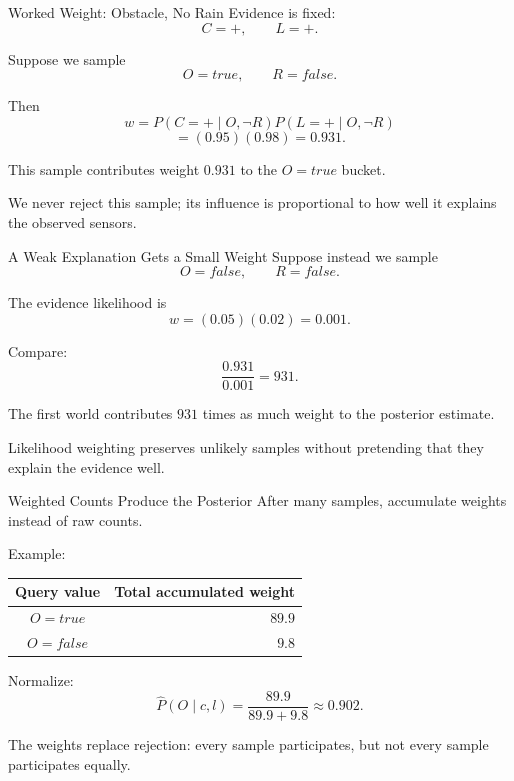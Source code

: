 \documentclass[aspectratio=169,10pt]{beamer}
\begin{document}
\begin{frame}[shrink=10]{Worked Weight: Obstacle, No Rain}
  Evidence is fixed:
  \[
    C=+,\qquad L=+.
  \]

  Suppose we sample
  \[
    O=true,\qquad R=false.
  \]

  Then
  \[
    w=P(C=+\mid O,\neg R)P(L=+\mid O,\neg R)
  \]
  \[
    =(0.95)(0.98)=0.931.
  \]

  This sample contributes weight $0.931$ to the $O=true$ bucket.

  \begin{keyidea}
    We never reject this sample; its influence is proportional to how well it explains the observed sensors.
  \end{keyidea}
\end{frame}

\begin{frame}[shrink=10]{A Weak Explanation Gets a Small Weight}
  Suppose instead we sample
  \[
    O=false,\qquad R=false.
  \]

  The evidence likelihood is
  \[
    w=(0.05)(0.02)=0.001.
  \]

  Compare:
  \[
    \frac{0.931}{0.001}=931.
  \]

  The first world contributes $931$ times as much weight to the posterior estimate.

  \begin{keyidea}
    Likelihood weighting preserves unlikely samples without pretending that they explain the evidence well.
  \end{keyidea}
\end{frame}

\begin{frame}[shrink=10]{Weighted Counts Produce the Posterior}
  After many samples, accumulate weights instead of raw counts.

  Example:
  \begin{center}
  \renewcommand{\arraystretch}{1.3}
  \begin{tabular}{c|r}
    \textbf{Query value} & \textbf{Total accumulated weight} \\\hline
    $O=true$ & $89.9$ \\
    $O=false$ & $9.8$
  \end{tabular}
  \end{center}

  Normalize:
  \[
    \widehat{P}(O\mid c,l)
    =
    \frac{89.9}{89.9+9.8}
    \approx 0.902.
  \]

  \begin{keyidea}
    The weights replace rejection: every sample participates, but not every sample participates equally.
  \end{keyidea}
\end{frame}
\end{document}

